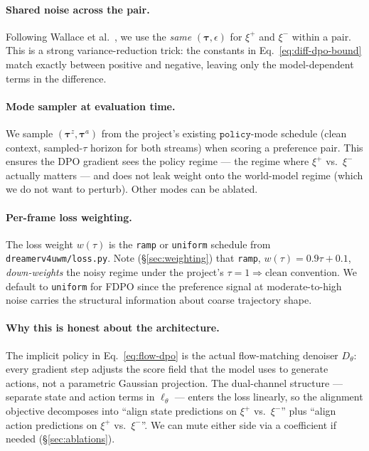 \documentclass[11pt]{article}
\newcommand{\Dtheta}{D_\theta}
\begin{document}
\paragraph{Shared noise across the pair.}
Following Wallace et al.~\cite{wallace2024diffusion}, we use the \emph{same} $(\boldsymbol{\tau}, \epsilon)$ for $\xi^+$ and $\xi^-$ within a pair. This is a strong variance-reduction trick: the constants in Eq.~\eqref{eq:diff-dpo-bound} match exactly between positive and negative, leaving only the model-dependent terms in the difference.

\paragraph{Mode sampler at evaluation time.}
We sample $(\boldsymbol{\tau}^z, \boldsymbol{\tau}^a)$ from the project's existing $\texttt{policy}$-mode schedule (clean context, sampled-$\tau$ horizon for both streams) when scoring a preference pair. This ensures the DPO gradient sees the policy regime --- the regime where $\xi^+$ vs.\ $\xi^-$ actually matters --- and does not leak weight onto the world-model regime (which we do not want to perturb). Other modes can be ablated.

\paragraph{Per-frame loss weighting.}
The loss weight $w(\tau)$ is the \texttt{ramp} or \texttt{uniform} schedule from \texttt{dreamerv4uwm/loss.py}. Note (\S\ref{sec:weighting}) that \texttt{ramp}, $w(\tau) = 0.9\tau + 0.1$, \emph{down-weights} the noisy regime under the project's $\tau{=}1{\Rightarrow}\mathrm{clean}$ convention. We default to \texttt{uniform} for FDPO since the preference signal at moderate-to-high noise carries the structural information about coarse trajectory shape.

\paragraph{Why this is honest about the architecture.}
The implicit policy in Eq.~\eqref{eq:flow-dpo} is the actual flow-matching denoiser $\Dtheta$: every gradient step adjusts the score field that the model uses to generate actions, not a parametric Gaussian projection. The dual-channel structure --- separate state and action terms in $\ell_\theta$ --- enters the loss linearly, so the alignment objective decomposes into ``align state predictions on $\xi^+$ vs.\ $\xi^-$'' plus ``align action predictions on $\xi^+$ vs.\ $\xi^-$''. We can mute either side via a coefficient if needed (\S\ref{sec:ablations}).
\end{document}
